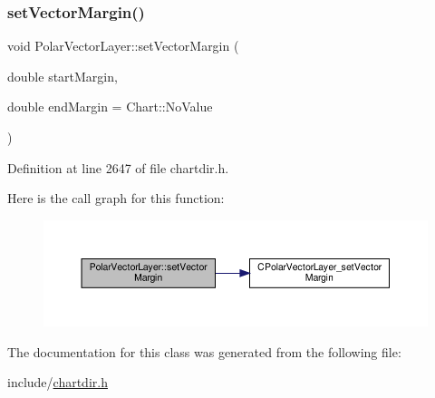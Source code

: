 \subsubsection{\texorpdfstring{set\+Vector\+Margin()}{setVectorMargin()}}
{\footnotesize\ttfamily void Polar\+Vector\+Layer\+::set\+Vector\+Margin (\begin{DoxyParamCaption}\item[{double}]{start\+Margin,  }\item[{double}]{end\+Margin = {\ttfamily Chart\+:\+:NoValue} }\end{DoxyParamCaption})\hspace{0.3cm}{\ttfamily [inline]}}



Definition at line 2647 of file chartdir.\+h.

Here is the call graph for this function\+:
\nopagebreak
\begin{figure}[H]
\begin{center}
\leavevmode
\includegraphics[width=350pt]{class_polar_vector_layer_af632962b27285ff43ce920aecf6111f5_cgraph}
\end{center}
\end{figure}


The documentation for this class was generated from the following file\+:\begin{DoxyCompactItemize}
\item 
include/\hyperlink{chartdir_8h}{chartdir.\+h}\end{DoxyCompactItemize}
